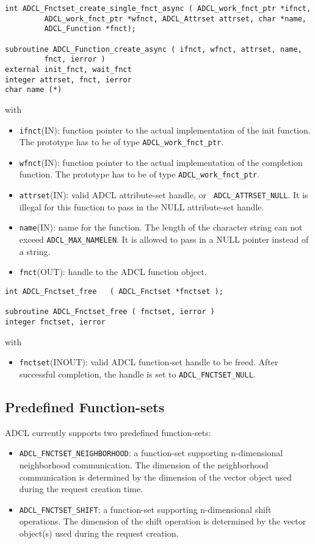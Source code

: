 \begin{verbatim}
int ADCL_Fnctset_create_single_fnct_async ( ADCL_work_fnct_ptr *ifnct, 
         ADCL_work_fnct_ptr *wfnct, ADCL_Attrset attrset, char *name, 
         ADCL_Function *fnct);

subroutine ADCL_Function_create_async ( ifnct, wfnct, attrset, name, 
         fnct, ierror )
external init_fnct, wait_fnct
integer attrset, fnct, ierror
char name (*)	  
\end{verbatim}
with
\begin{itemize}
\item {\tt ifnct}(IN): function pointer to the actual implementation of
  the init function. The prototype has to be of type {\tt ADCL\_work\_fnct\_ptr}.
\item {\tt wfnct}(IN): function pointer to the actual implementation of
  the completion function. The prototype has to be of type {\tt ADCL\_work\_fnct\_ptr}.
\item {\tt attrset}(IN): valid ADCL attribute-set handle, or {\tt
    ADCL\_ATTRSET\_NULL}. It is illegal for this function to pass in the NULL attribute-set 
    handle.
\item {\tt name}(IN): name for the function. The length of the character string can not exceed 
  {\tt ADCL\_MAX\_NAMELEN}. It is allowed to pass in a NULL pointer instead of a string.
\item {\tt fnct}(OUT): handle to the ADCL function object.
\end{itemize}



\hspace{1cm}
\begin{verbatim}
int ADCL_Fnctset_free   ( ADCL_Fnctset *fnctset );

subroutine ADCL_Fnctset_free ( fnctset, ierror )
integer fnctset, ierror
\end{verbatim}
with
\begin{itemize}
\item {\tt fnctset}(INOUT): valid ADCL function-set handle to be freed. After successful completion, the handle is set to {\tt ADCL\_FNCTSET\_NULL}.
\end{itemize}


\pagebreak
\subsection{Predefined Function-sets}
\label{fnctset-predef}

ADCL currently supports two predefined function-sets: 
\begin{itemize}
\item {\tt ADCL\_FNCTSET\_NEIGHBORHOOD}: a function-set supporting
  n-dimensional neighborhood communication. The dimension of the neighborhood
  communication is determined by the dimension of the vector object used
  during the request creation time.
\item {\tt ADCL\_FNCTSET\_SHIFT}: a function-set supporting n-dimensional
  shift operations. The dimension of the shift operation is determined by the
  vector object(s) used during the request creation.
\end{itemize}

